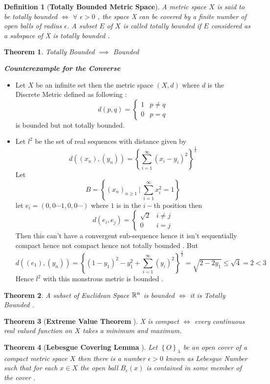\documentclass{article}
\newenvironment{simplebox}{\begin{tcolorbox}[colback=white,colframe=DarkBlue,sharp corners]\vspace{0.3cm}}{\vspace{0.3cm }
\end{tcolorbox}}
\newcommand{\set}[1]{\left\{#1\right\}}
\newtheorem{theorem}{Theorem}[section]
\newtheorem{defn}{Definition}[section]
\begin{document}
\begin{defn}
	[\textbf{Totally Bounded Metric Space}] A metric space $X$ is said to be totally bounded 
	$\iff$ $\forall $ $\epsilon >0$ , the space X can  be covered by a finite number of open balls of radius $\epsilon$. A subset $E$ of $X$ is called totally bounded if $E$ considered as a subspace of X is totally bounded .  
\end{defn}
\begin{theorem}
	Totally Bounded $\implies$ Bounded 
\end{theorem}
\begin{simplebox}
\begin{center}
	\textbf{\textit{Counterexample for the Converse}}
\end{center}
\begin{itemize}
	\item  Let $X$ be an infinite set then the metric space $(X,d)$ where $d$ is the Discrete Metric defined as following : 
	\[d(p,q)=\begin{cases}
		1 & p\neq q \\
		0 & p=q
	\end{cases}\]
is bounded but not totally bounded.
\item Let $l^2$ be the set of real sequences with distance given by \[d\left((x_n),(y_n)\right) = \left\{\sum_{i=1}^{\infty}(x_i-y_i)^2\right\}^{\frac{1}{2}}\] Let \[B=\set{(x_n)_{n\geq 1} \ \big| \ \sum_{i=1}^{\infty}x_i ^2 = 1 }\] let $e_i = (0,0 \cdots 1,0,0\cdots )$ where $1$ is in the $i-$th position then \[d(e_i,e_j) =  \begin{cases}
	\sqrt{2} & i\neq j \\
	0 & i=j
\end{cases}\]
Then this can't have a convergent sub-sequence hence it isn't sequentially compact hence not compact hence not totally bounded . But \[d\left((e_1),(y_n)\right) = \left\{(1-y_1)^2-y_1^2+\sum_{i=1}^{\infty}(y_i)^2\right\}^{\frac{1}{2}} = \sqrt{2-2y_1}\leq \sqrt{4} = 2<3 \] Hence $l^2$ with this monstrous metric is bounded .
\end{itemize}
\end{simplebox}
\begin{theorem}
	A subset of Euclidean Space $\mathbb{R}^n$ is bounded $\iff$ it is Totally Bounded .	
\end{theorem}
\begin{theorem}[\textbf{Extreme Value Theorem} ]
	X is compact $\iff$ every continuous real valued function on $X$
	takes a minimum and maximum.
\end{theorem}
\begin{theorem}[\textbf{Lebesgue Covering Lemma }]
		Let $\set{O}_{\lambda}$ be an open cover of a compact metric space $X$ then there is a number $\epsilon>0$ known as Lebesgue Number such that for each $x\in X $ the open ball $B_{\epsilon}(x) $ is contained in some member of the cover .
\end{theorem}
\end{document}
